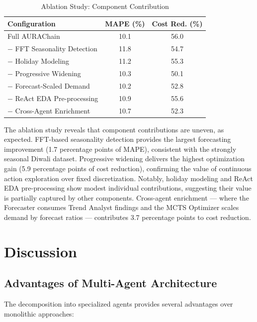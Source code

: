 \documentclass[conference]{IEEEtran}
\begin{document}
\begin{table}[htbp]
\caption{Ablation Study: Component Contribution}
\label{tab:ablation}
\centering
\small
\begin{tabular}{@{}lcc@{}}
\toprule
\textbf{Configuration} & \textbf{MAPE (\%)} & \textbf{Cost Red. (\%)} \\
\midrule
Full AURAChain & 10.1 & 56.0 \\
$-$ FFT Seasonality Detection & 11.8 & 54.7 \\
$-$ Holiday Modeling & 11.2 & 55.3 \\
$-$ Progressive Widening & 10.3 & 50.1 \\
$-$ Forecast-Scaled Demand & 10.2 & 52.8 \\
$-$ ReAct EDA Pre-processing & 10.9 & 55.6 \\
$-$ Cross-Agent Enrichment & 10.7 & 52.3 \\
\bottomrule
\end{tabular}
\end{table}

The ablation study reveals that component contributions are uneven, as expected. FFT-based seasonality detection provides the largest forecasting improvement (1.7 percentage points of MAPE), consistent with the strongly seasonal Diwali dataset. Progressive widening delivers the highest optimization gain (5.9 percentage points of cost reduction), confirming the value of continuous action exploration over fixed discretization. Notably, holiday modeling and ReAct EDA pre-processing show modest individual contributions, suggesting their value is partially captured by other components. Cross-agent enrichment --- where the Forecaster consumes Trend Analyst findings and the MCTS Optimizer scales demand by forecast ratios --- contributes 3.7 percentage points to cost reduction.

\section{Discussion}

\subsection{Advantages of Multi-Agent Architecture}

The decomposition into specialized agents provides several advantages over monolithic approaches:
\end{document}
